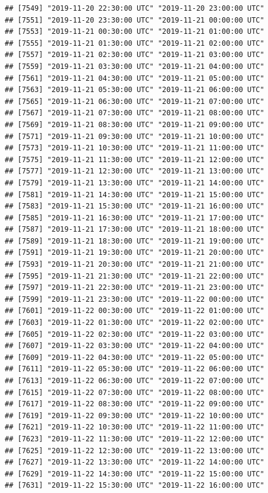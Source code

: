\documentclass{article}\usepackage[]{graphicx}\usepackage[]{color}
\makeatletter
\newenvironment{kframe}{%
 \def\at@end@of@kframe{}%
 \ifinner\ifhmode%
  \def\at@end@of@kframe{\end{minipage}}%
  \begin{minipage}{\columnwidth}%
 \fi\fi%
 \def\FrameCommand##1{\hskip\@totalleftmargin \hskip-\fboxsep
 \colorbox{shadecolor}{##1}\hskip-\fboxsep
     \hskip-\linewidth \hskip-\@totalleftmargin \hskip\columnwidth}%
 \MakeFramed {\advance\hsize-\width
   \@totalleftmargin\z@ \linewidth\hsize
   \@setminipage}}%
 {\par\unskip\endMakeFramed%
 \at@end@of@kframe}
\newenvironment{knitrout}{}{} %
\makeatother
\begin{document}
\begin{knitrout}
\begin{kframe}
\begin{verbatim}
## [7549] "2019-11-20 22:30:00 UTC" "2019-11-20 23:00:00 UTC"
## [7551] "2019-11-20 23:30:00 UTC" "2019-11-21 00:00:00 UTC"
## [7553] "2019-11-21 00:30:00 UTC" "2019-11-21 01:00:00 UTC"
## [7555] "2019-11-21 01:30:00 UTC" "2019-11-21 02:00:00 UTC"
## [7557] "2019-11-21 02:30:00 UTC" "2019-11-21 03:00:00 UTC"
## [7559] "2019-11-21 03:30:00 UTC" "2019-11-21 04:00:00 UTC"
## [7561] "2019-11-21 04:30:00 UTC" "2019-11-21 05:00:00 UTC"
## [7563] "2019-11-21 05:30:00 UTC" "2019-11-21 06:00:00 UTC"
## [7565] "2019-11-21 06:30:00 UTC" "2019-11-21 07:00:00 UTC"
## [7567] "2019-11-21 07:30:00 UTC" "2019-11-21 08:00:00 UTC"
## [7569] "2019-11-21 08:30:00 UTC" "2019-11-21 09:00:00 UTC"
## [7571] "2019-11-21 09:30:00 UTC" "2019-11-21 10:00:00 UTC"
## [7573] "2019-11-21 10:30:00 UTC" "2019-11-21 11:00:00 UTC"
## [7575] "2019-11-21 11:30:00 UTC" "2019-11-21 12:00:00 UTC"
## [7577] "2019-11-21 12:30:00 UTC" "2019-11-21 13:00:00 UTC"
## [7579] "2019-11-21 13:30:00 UTC" "2019-11-21 14:00:00 UTC"
## [7581] "2019-11-21 14:30:00 UTC" "2019-11-21 15:00:00 UTC"
## [7583] "2019-11-21 15:30:00 UTC" "2019-11-21 16:00:00 UTC"
## [7585] "2019-11-21 16:30:00 UTC" "2019-11-21 17:00:00 UTC"
## [7587] "2019-11-21 17:30:00 UTC" "2019-11-21 18:00:00 UTC"
## [7589] "2019-11-21 18:30:00 UTC" "2019-11-21 19:00:00 UTC"
## [7591] "2019-11-21 19:30:00 UTC" "2019-11-21 20:00:00 UTC"
## [7593] "2019-11-21 20:30:00 UTC" "2019-11-21 21:00:00 UTC"
## [7595] "2019-11-21 21:30:00 UTC" "2019-11-21 22:00:00 UTC"
## [7597] "2019-11-21 22:30:00 UTC" "2019-11-21 23:00:00 UTC"
## [7599] "2019-11-21 23:30:00 UTC" "2019-11-22 00:00:00 UTC"
## [7601] "2019-11-22 00:30:00 UTC" "2019-11-22 01:00:00 UTC"
## [7603] "2019-11-22 01:30:00 UTC" "2019-11-22 02:00:00 UTC"
## [7605] "2019-11-22 02:30:00 UTC" "2019-11-22 03:00:00 UTC"
## [7607] "2019-11-22 03:30:00 UTC" "2019-11-22 04:00:00 UTC"
## [7609] "2019-11-22 04:30:00 UTC" "2019-11-22 05:00:00 UTC"
## [7611] "2019-11-22 05:30:00 UTC" "2019-11-22 06:00:00 UTC"
## [7613] "2019-11-22 06:30:00 UTC" "2019-11-22 07:00:00 UTC"
## [7615] "2019-11-22 07:30:00 UTC" "2019-11-22 08:00:00 UTC"
## [7617] "2019-11-22 08:30:00 UTC" "2019-11-22 09:00:00 UTC"
## [7619] "2019-11-22 09:30:00 UTC" "2019-11-22 10:00:00 UTC"
## [7621] "2019-11-22 10:30:00 UTC" "2019-11-22 11:00:00 UTC"
## [7623] "2019-11-22 11:30:00 UTC" "2019-11-22 12:00:00 UTC"
## [7625] "2019-11-22 12:30:00 UTC" "2019-11-22 13:00:00 UTC"
## [7627] "2019-11-22 13:30:00 UTC" "2019-11-22 14:00:00 UTC"
## [7629] "2019-11-22 14:30:00 UTC" "2019-11-22 15:00:00 UTC"
## [7631] "2019-11-22 15:30:00 UTC" "2019-11-22 16:00:00 UTC"

\end{verbatim}
\end{kframe}
\end{knitrout}
\end{document}
